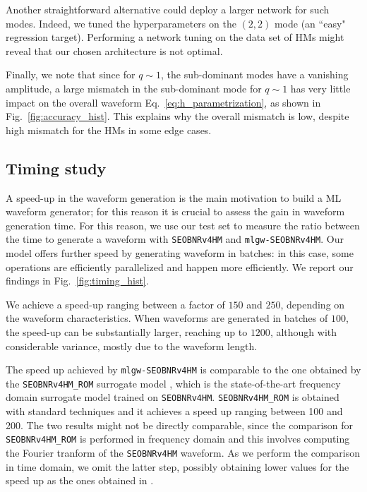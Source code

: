 \documentclass[twocolumn,showpacs,preprintnumbers,nofootinbib,prd,
superscriptaddress,10pt]{revtex4-2}
\begin{document}
Another straightforward alternative could deploy a larger network for such modes. Indeed, we tuned the hyperparameters on the $(2,2)$ mode (an ``easy" regression target). Performing a network tuning on the data set of HMs might reveal that our chosen architecture is not optimal.

Finally, we note that since for $q\sim 1$, the sub-dominant modes have a vanishing amplitude, a large mismatch in the 
sub-dominant mode for $q\sim 1$ has very little impact on the overall waveform Eq.~\eqref{eq:h_parametrization}, 
as shown in Fig.~\ref{fig:accuracy_hist}.
This explains why the overall mismatch is low, despite high mismatch for the HMs in some edge cases.

\subsection{Timing study}
\label{sec:timing}

A speed-up in the waveform generation is the main motivation to build a ML waveform generator; for this reason it is crucial to assess the gain in waveform generation time.
For this reason, we use our test set to measure the ratio between the time to generate a waveform with \texttt{SEOBNRv4HM} and \texttt{mlgw-SEOBNRv4HM}. Our model offers further speed by generating waveform in batches: in this case, some operations are efficiently parallelized and happen more efficiently.
We report our findings in Fig.~\ref{fig:timing_hist}.

We achieve a speed-up ranging between a factor of $150$ and $250$, depending on the waveform characteristics. When waveforms are generated in batches of $100$, the speed-up can be substantially larger, reaching up to $1200$, although with considerable variance, mostly due to the waveform length.

The speed up achieved by \texttt{mlgw-SEOBNRv4HM} is comparable to the one obtained by the \texttt{SEOBNRv4HM\_ROM} surrogate model \cite{Cotesta:2020qhw}, which is the state-of-the-art frequency domain surrogate model trained on \texttt{SEOBNRv4HM}. \texttt{SEOBNRv4HM\_ROM} is obtained with standard techniques and it achieves a speed up ranging between 100 and 200.
The two results might not be directly comparable, since the comparison for \texttt{SEOBNRv4HM\_ROM} is performed in frequency domain and this involves computing the Fourier tranform of the \texttt{SEOBNRv4HM} waveform. As we perform the comparison in time domain, we omit the latter step, possibly obtaining lower values for the speed up as the ones obtained in \cite{Cotesta:2020qhw}. 
\end{document}
